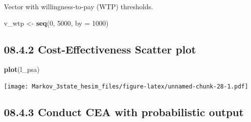 \documentclass[
]{article}
\newenvironment{Shaded}{\begin{snugshade}}{\end{snugshade}}
\newcommand{\CommentTok}[1]{\textcolor[rgb]{0.56,0.35,0.01}{\textit{#1}}}
\newcommand{\DataTypeTok}[1]{\textcolor[rgb]{0.13,0.29,0.53}{#1}}
\newcommand{\DecValTok}[1]{\textcolor[rgb]{0.00,0.00,0.81}{#1}}
\newcommand{\KeywordTok}[1]{\textcolor[rgb]{0.13,0.29,0.53}{\textbf{#1}}}
\newcommand{\NormalTok}[1]{#1}
\newcommand{\OperatorTok}[1]{\textcolor[rgb]{0.81,0.36,0.00}{\textbf{#1}}}
\newcommand{\StringTok}[1]{\textcolor[rgb]{0.31,0.60,0.02}{#1}}
\begin{document}
Vector with willingness-to-pay (WTP) thresholds.

\begin{Shaded}
\begin{Highlighting}[]
\NormalTok{v_wtp <-}\StringTok{ }\KeywordTok{seq}\NormalTok{(}\DecValTok{0}\NormalTok{, }\DecValTok{5000}\NormalTok{, }\DataTypeTok{by =} \DecValTok{1000}\NormalTok{)}
\end{Highlighting}
\end{Shaded}

\hypertarget{cost-effectiveness-scatter-plot}{%
\subsection{08.4.2 Cost-Effectiveness Scatter
plot}\label{cost-effectiveness-scatter-plot}}

\begin{Shaded}
\begin{Highlighting}[]
\KeywordTok{plot}\NormalTok{(l_psa)}
\end{Highlighting}
\end{Shaded}

\texttt{[image: Markov\_3state\_hesim\_files/figure-latex/unnamed-chunk-28-1.pdf]}

\hypertarget{conduct-cea-with-probabilistic-output}{%
\subsection{08.4.3 Conduct CEA with probabilistic
output}\label{conduct-cea-with-probabilistic-output}}

\begin{Shaded}
\end{Shaded}
\end{document}
